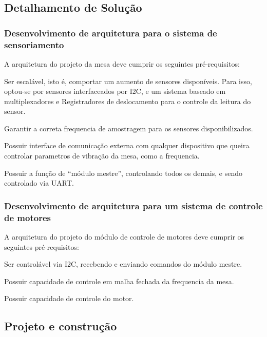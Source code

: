 \subsection{Detalhamento de Solução}

\subsubsection{Desenvolvimento de arquitetura para o sistema de sensoriamento}

A arquitetura do projeto da mesa deve cumprir os seguintes pré-requisitos:

\begin{enumerated}
	\item Ser escalável, isto é, comportar um aumento de sensores disponíveis. Para isso, optou-se por sensores interfaceados por I2C, e um sistema baseado em multiplexadores e Registradores de deslocamento para o controle da leitura do sensor.
	\item Garantir a correta frequencia de amostragem para os sensores disponibilizados. 
	\item Possuir interface de comunicação externa com qualquer dispositivo que queira controlar parametros de vibração da mesa, como a frequencia.
	\item Possuir a função de “módulo mestre”, controlando todos os demais, e sendo controlado via UART.
\end{enumerated}

\subsubsection{Desenvolvimento de arquitetura para um sistema de controle de motores}

A arquitetura do projeto do módulo de controle de motores deve cumprir os seguintes pré-requisitos:

\begin{enumerated}
	\item Ser  controlável via I2C, recebendo e enviando comandos do módulo mestre.
	\item Possuir capacidade de controle em malha fechada da frequencia da mesa.
	\item Possuir capacidade de controle do motor.
\end{enumerated}

\subsection{Projeto e construção}

